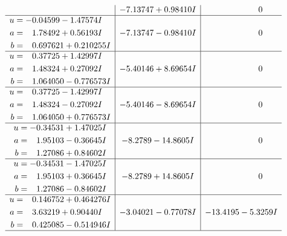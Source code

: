 \documentclass[1p]{elsarticle_modified}
\theoremstyle{definition}
\begin{document}
$$\begin{array}{c|c|c}
 & -7.13747 + 0.98410 I & \phantom{-0.000000 } 0 \\ \hline\begin{aligned}
u &= -0.04599 - 1.47574 I \\
a &= \phantom{-}1.78492 + 0.56193 I \\
b &= \phantom{-}0.697621 + 0.210255 I\end{aligned}
 & -7.13747 - 0.98410 I & \phantom{-0.000000 } 0 \\ \hline\begin{aligned}
u &= \phantom{-}0.37725 + 1.42997 I \\
a &= \phantom{-}1.48324 + 0.27092 I \\
b &= \phantom{-}1.064050 - 0.776573 I\end{aligned}
 & -5.40146 + 8.69654 I & \phantom{-0.000000 } 0 \\ \hline\begin{aligned}
u &= \phantom{-}0.37725 - 1.42997 I \\
a &= \phantom{-}1.48324 - 0.27092 I \\
b &= \phantom{-}1.064050 + 0.776573 I\end{aligned}
 & -5.40146 - 8.69654 I & \phantom{-0.000000 } 0 \\ \hline\begin{aligned}
u &= -0.34531 + 1.47025 I \\
a &= \phantom{-}1.95103 - 0.36645 I \\
b &= \phantom{-}1.27086 + 0.84602 I\end{aligned}
 & -8.2789 - 14.8605 I & \phantom{-0.000000 } 0 \\ \hline\begin{aligned}
u &= -0.34531 - 1.47025 I \\
a &= \phantom{-}1.95103 + 0.36645 I \\
b &= \phantom{-}1.27086 - 0.84602 I\end{aligned}
 & -8.2789 + 14.8605 I & \phantom{-0.000000 } 0 \\ \hline\begin{aligned}
u &= \phantom{-}0.146752 + 0.464276 I \\
a &= \phantom{-}3.63219 + 0.90440 I \\
b &= \phantom{-}0.425085 - 0.514946 I\end{aligned}
 & -3.04021 - 0.77078 I & -13.4195 - 5.3259 I\\
 \hline 
 \end{array}$$\newpage$$\begin{array}{c|c|c}  

\end{array}$$
\end{document}
